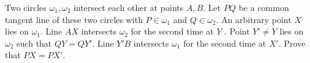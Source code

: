 Two circles $\omega_1,\omega_2$ intersect each other at points $A,B$. Let $PQ$ be a common tangent line of these two circles with $P \in \omega_1$ and $Q  \in  \omega_2$. An arbitrary point $X$ lies on $\omega_1$. Line $AX$ intersects $ \omega_2$ for the second time at $Y$ . Point $Y'\ne Y$ lies on $\omega_2$ such that $QY = QY'$. Line $Y'B$ intersects $ \omega_1$ for the second time at $X'$. Prove that $PX = PX'$.